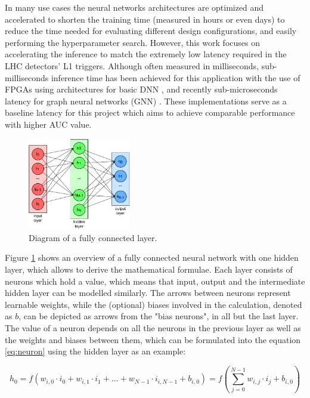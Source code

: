 In many use cases the neural networks architectures are optimized and accelerated to shorten the training time (measured in hours or even days) to reduce the time needed for evaluating different design configurations, and easily performing the hyperparameter search. However, this work focuses on accelerating the inference to match the extremely low latency required in the LHC detectors' L1 triggers. Although often measured in milliseconds, sub-milliseconds inference time has been achieved for this application with the use of FPGAs using architectures for basic DNN \cite{36-kreinar2018fast}, and recently sub-microseconds latency for graph neural networks (GNN) \cite{42-kreinar2020distance-weighted, 41-elabd2021graph}. These implementations serve as a baseline latency for this project which aims to achieve comparable performance with higher AUC value.

\begin{figure}[hpt!]
  \centering
  \includegraphics[trim={0cm 0cm 0cm 0cm}, width=0.4\textwidth, center]{background/fully_connected_layer.pdf}
  \caption{Diagram of a fully connected layer.}
  \label{fig:fully-connected-layer}
\end{figure}

Figure \ref{fig:fully-connected-layer} shows an overview of a fully connected neural network with one hidden layer, which allows to derive the mathematical formulae. Each layer consists of neurons which hold a value, which means that input, output and the intermediate hidden layer can be modelled similarly. The arrows between neurons represent learnable weights, while the (optional) biases involved in the calculation, denoted as \(b\), can be depicted as arrows from the "bias neurons", in all but the last layer. The value of a neuron depends on all the neurons in the previous layer as well as the weights and biases between them, which can be formulated into the equation \ref{eq:neuron} using the hidden layer as an example:

\begin{equation}\label{eq:neuron}
  h_0 = f ( w_{i, 0} \cdot i_0 + w_{i, 1} \cdot i_1 + \hdots + w_{N-1} \cdot i_{i, N-1} + b_{i, 0} )
  = f ( \sum_{j=0}^{N-1} w_{i, j} \cdot i_j + b_{i, 0} )
\end{equation}

